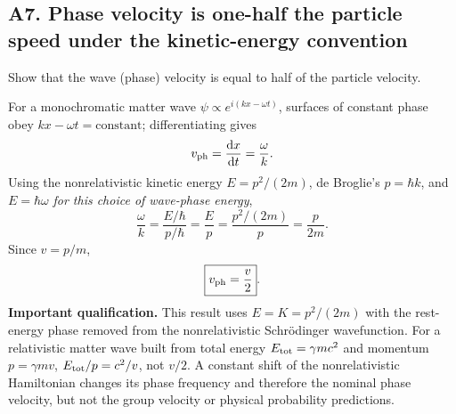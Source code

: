 \documentclass[11pt,a4paper]{article}
\newcommand{\dd}{\mathrm{d}}
\newcommand{\Sch}{Schr\"odinger}
\begin{document}
\subsection{A7. Phase velocity is one-half the particle speed under the kinetic-energy convention}
\begin{questionbox}Show that the wave (phase) velocity is equal to half of the particle velocity.\end{questionbox}
For a monochromatic matter wave $\psi\propto e^{i(kx-\omega t)}$, surfaces of constant phase obey $kx-\omega t=\text{constant}$; differentiating gives
\begin{equation}v_{\rm ph}=\frac{\dd x}{\dd t}=\frac\omega k.
\end{equation}
Using the nonrelativistic kinetic energy $E=p^2/(2m)$, de Broglie's $p=\hbar k$, and $E=\hbar\omega$ \emph{for this choice of wave-phase energy},
\begin{equation}
\frac\omega k=\frac{E/\hbar}{p/\hbar}=\frac Ep=\frac{p^2/(2m)}p=\frac p{2m}.
\end{equation}
Since $v=p/m$,
\begin{equation}
\boxed{v_{\rm ph}=\frac v2}.
\end{equation}
\textbf{Important qualification.} This result uses $E=K=p^2/(2m)$ with the rest-energy phase removed from the nonrelativistic \Sch{} wavefunction. For a relativistic matter wave built from total energy $E_{\rm tot}=\gamma mc^2$ and momentum $p=\gamma mv$, $E_{\rm tot}/p=c^2/v$, not $v/2$. A constant shift of the nonrelativistic Hamiltonian changes its phase frequency and therefore the nominal phase velocity, but not the group velocity or physical probability predictions.
\end{document}
